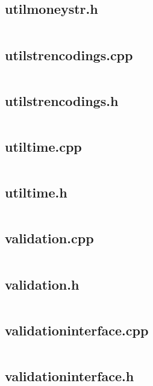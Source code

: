\documentclass{article}
\begin{document}
\subsection{utilmoneystr.h}
\inputminted{cpp}{/home/dufferzafar/dev/@clones/bitcoin/src/utilmoneystr.h}
\newpage

\subsection{utilstrencodings.cpp}
\inputminted{cpp}{/home/dufferzafar/dev/@clones/bitcoin/src/utilstrencodings.cpp}
\newpage

\subsection{utilstrencodings.h}
\inputminted{cpp}{/home/dufferzafar/dev/@clones/bitcoin/src/utilstrencodings.h}
\newpage

\subsection{utiltime.cpp}
\inputminted{cpp}{/home/dufferzafar/dev/@clones/bitcoin/src/utiltime.cpp}
\newpage

\subsection{utiltime.h}
\inputminted{cpp}{/home/dufferzafar/dev/@clones/bitcoin/src/utiltime.h}
\newpage

\subsection{validation.cpp}
\inputminted{cpp}{/home/dufferzafar/dev/@clones/bitcoin/src/validation.cpp}
\newpage

\subsection{validation.h}
\inputminted{cpp}{/home/dufferzafar/dev/@clones/bitcoin/src/validation.h}
\newpage

\subsection{validationinterface.cpp}
\inputminted{cpp}{/home/dufferzafar/dev/@clones/bitcoin/src/validationinterface.cpp}
\newpage

\subsection{validationinterface.h}
\inputminted{cpp}{/home/dufferzafar/dev/@clones/bitcoin/src/validationinterface.h}
\newpage
\end{document}
